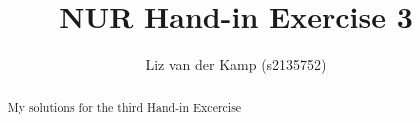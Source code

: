 \documentclass[a4paper,10pt]{article}
\title{NUR Hand-in Exercise 3}
\author{Liz van der Kamp (s2135752)}
\begin{document}
\maketitle

\begin{abstract}
 My solutions for the third Hand-in Excercise
\end{abstract}


\end{document}
